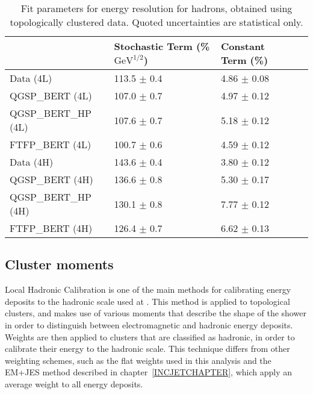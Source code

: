 \begin{table}[!htb]
\begin{center}
\begin{tabular}{|l|l|l|l|}
\hline
& Stochastic Term (\% $\mathrm{GeV}^{1/2}$) & Constant Term (\%) \\
\hline
Data (4L) & 113.5 $\pm$ 0.4 & 4.86 $\pm$ 0.08\\
QGSP\_BERT (4L) & 107.0 $\pm$ 0.7 & 4.97 $\pm$ 0.12\\
QGSP\_BERT\_HP (4L) & 107.6 $\pm$ 0.7 & 5.18 $\pm$ 0.12\\
FTFP\_BERT (4L) & 100.7 $\pm$ 0.6 & 4.59 $\pm$ 0.12\\
Data (4H) & 143.6 $\pm$ 0.4 & 3.80 $\pm$ 0.12\\
QGSP\_BERT (4H) & 136.6 $\pm$ 0.8 & 5.30 $\pm$ 0.17\\
QGSP\_BERT\_HP (4H) & 130.1 $\pm$ 0.8 & 7.77 $\pm$ 0.12\\
FTFP\_BERT (4H) & 126.4 $\pm$ 0.7 & 6.62 $\pm$ 0.13\\
\hline
\end{tabular}
\end{center}
\caption[Hadron resolution results, topoclusters]{Fit parameters for energy resolution for hadrons, obtained using topologically clustered data. Quoted uncertainties are statistical only.}
\label{table_resolution_hadrons_t420}
\end{table}
\subsection{Cluster moments}
Local Hadronic Calibration is one of the main methods for calibrating energy deposits to the hadronic scale used at \atlas \cite{localHadronicCalibration}. This method is applied to topological clusters, and makes use of various moments that describe the shape of the shower in order to distinguish between electromagnetic and hadronic energy deposits. Weights are then applied to clusters that are classified as hadronic, in order to calibrate their energy to the hadronic scale. This technique differs from other weighting schemes, such as the flat weights used in this analysis and the EM+JES method described in chapter~\ref{INCJETCHAPTER}, which apply an average weight to all energy deposits.


